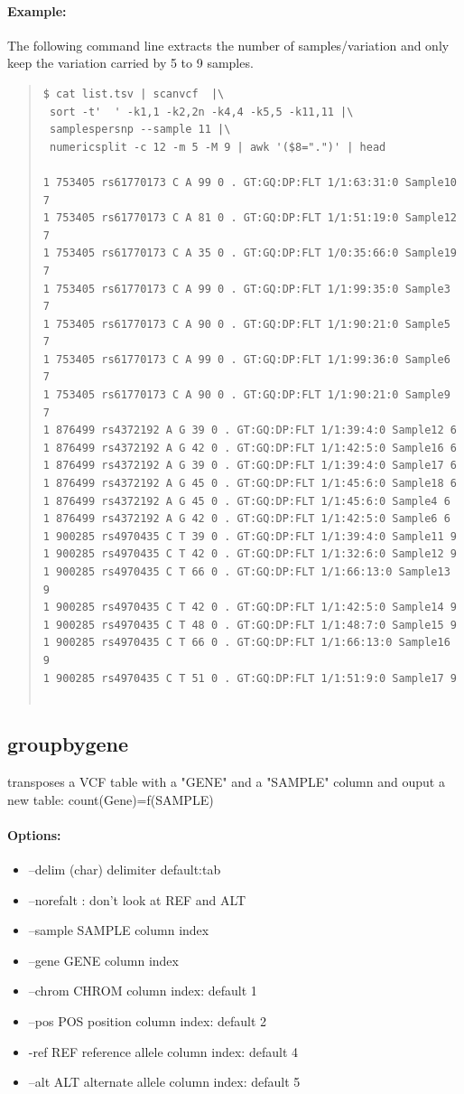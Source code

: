 \documentclass[12pt]{article}
\begin{document}
\paragraph{Example:}
The following command line extracts the number of samples/variation and only keep the variation carried by 5 to 9 samples.
\begin{quote}
\begin{verbatim}
$ cat list.tsv | scanvcf  |\
 sort -t'  ' -k1,1 -k2,2n -k4,4 -k5,5 -k11,11 |\
 samplespersnp --sample 11 |\
 numericsplit -c 12 -m 5 -M 9 | awk '($8=".")' | head

1 753405 rs61770173 C A 99 0 . GT:GQ:DP:FLT 1/1:63:31:0 Sample10 7
1 753405 rs61770173 C A 81 0 . GT:GQ:DP:FLT 1/1:51:19:0 Sample12 7
1 753405 rs61770173 C A 35 0 . GT:GQ:DP:FLT 1/0:35:66:0 Sample19 7
1 753405 rs61770173 C A 99 0 . GT:GQ:DP:FLT 1/1:99:35:0 Sample3 7
1 753405 rs61770173 C A 90 0 . GT:GQ:DP:FLT 1/1:90:21:0 Sample5 7
1 753405 rs61770173 C A 99 0 . GT:GQ:DP:FLT 1/1:99:36:0 Sample6 7
1 753405 rs61770173 C A 90 0 . GT:GQ:DP:FLT 1/1:90:21:0 Sample9 7
1 876499 rs4372192 A G 39 0 . GT:GQ:DP:FLT 1/1:39:4:0 Sample12 6
1 876499 rs4372192 A G 42 0 . GT:GQ:DP:FLT 1/1:42:5:0 Sample16 6
1 876499 rs4372192 A G 39 0 . GT:GQ:DP:FLT 1/1:39:4:0 Sample17 6
1 876499 rs4372192 A G 45 0 . GT:GQ:DP:FLT 1/1:45:6:0 Sample18 6
1 876499 rs4372192 A G 45 0 . GT:GQ:DP:FLT 1/1:45:6:0 Sample4 6
1 876499 rs4372192 A G 42 0 . GT:GQ:DP:FLT 1/1:42:5:0 Sample6 6
1 900285 rs4970435 C T 39 0 . GT:GQ:DP:FLT 1/1:39:4:0 Sample11 9
1 900285 rs4970435 C T 42 0 . GT:GQ:DP:FLT 1/1:32:6:0 Sample12 9
1 900285 rs4970435 C T 66 0 . GT:GQ:DP:FLT 1/1:66:13:0 Sample13 9
1 900285 rs4970435 C T 42 0 . GT:GQ:DP:FLT 1/1:42:5:0 Sample14 9
1 900285 rs4970435 C T 48 0 . GT:GQ:DP:FLT 1/1:48:7:0 Sample15 9
1 900285 rs4970435 C T 66 0 . GT:GQ:DP:FLT 1/1:66:13:0 Sample16 9
1 900285 rs4970435 C T 51 0 . GT:GQ:DP:FLT 1/1:51:9:0 Sample17 9


\end{verbatim}
\end{quote}

\subsection{groupbygene}
transposes a VCF table with a "GENE" and a "SAMPLE" column and ouput a new table: count(Gene)=f(SAMPLE)
\paragraph{Options:}
\begin{itemize}
\item--delim (char) delimiter default:tab
\item--norefalt : don't look at REF and ALT
\item--sample SAMPLE column index
\item--gene GENE column index
\item--chrom CHROM column index: default 1
\item--pos POS position column index: default 2
\item-ref REF reference allele column index: default 4
\item--alt ALT alternate allele column index: default 5
\end{itemize}
\end{document}
